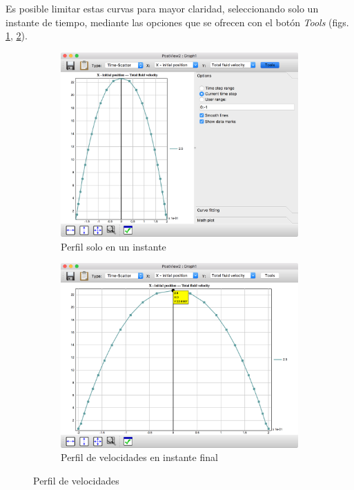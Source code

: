 Es posible limitar estas curvas para mayor claridad, seleccionando solo un instante de tiempo, mediante las opciones que se ofrecen con el botón \emph{Tools} (figs. \ref{fig:08-post-vprof-out-2}, \ref{fig:08-post-vprof-out-3}).
\begin{figure}[!ht]
\centering
\begin{subfigure}[b]{0.48\textwidth}
\centering
\includegraphics[width=\linewidth]{figuras_4/08-post-vprof-out-2.png}
\caption{Perfil solo en un instante}
\label{fig:08-post-vprof-out-2}
\end{subfigure}
\hfil
\begin{subfigure}[b]{0.48\textwidth}
\includegraphics[width=\linewidth]{figuras_4/08-post-vprof-out-3.png}
\caption{Perfil de velocidades en instante final}
\label{fig:08-post-vprof-out-3}
\end{subfigure}
\caption{Perfil de velocidades}
\label{fig:08-post-vprof-out-2-3}
\end{figure}

